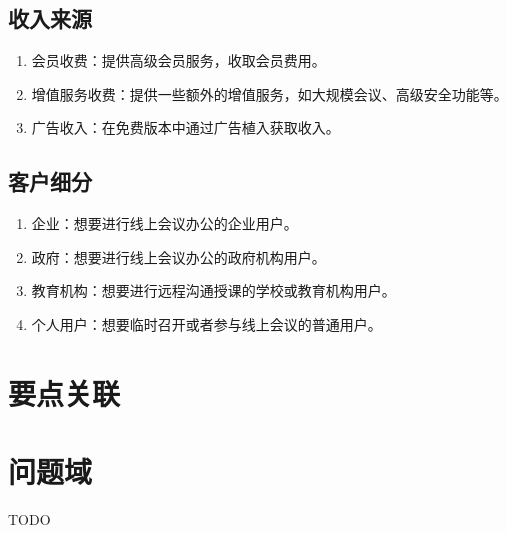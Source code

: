 \documentclass[a4paper,12pt]{article}
\begin{document}
\subsection{收入来源}
\begin{enumerate}
    \item 会员收费：提供高级会员服务，收取会员费用。
    \item 增值服务收费：提供一些额外的增值服务，如大规模会议、高级安全功能等。
    \item 广告收入：在免费版本中通过广告植入获取收入。
\end{enumerate}

\subsection{客户细分}
\begin{enumerate}
    \item 企业：想要进行线上会议办公的企业用户。
    \item 政府：想要进行线上会议办公的政府机构用户。
    \item 教育机构：想要进行远程沟通授课的学校或教育机构用户。
    \item 个人用户：想要临时召开或者参与线上会议的普通用户。
\end{enumerate}
\tableofcontents
\section{要点关联}

\tableofcontents
\section{问题域}
TODO
\end{document}
